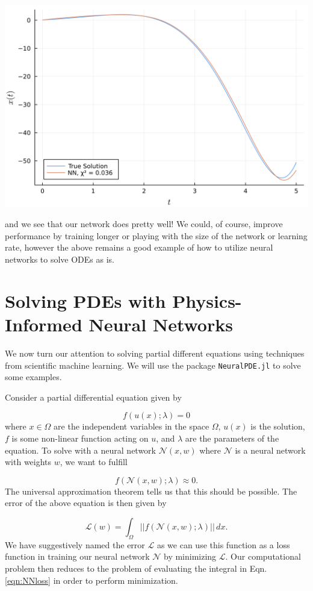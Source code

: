 \documentclass{CUP-JNL-DTM}%
\theoremstyle{definition}
\numberwithin{equation}{section}
\newcommand{\loss}{\mathcal{L}}
\newcommand{\net}{\mathcal{N}}
\begin{document}
\begin{center}
\includegraphics[width=0.45\linewidth]{figures/ODE_example.png}
\end{center}
and we see that our network does pretty well! We could, of course, improve performance by training longer or playing with the size of the network or learning rate, however the above remains a good example of how to utilize neural networks to solve ODEs as is. 


\section{Solving PDEs with Physics-Informed Neural Networks}

We now turn our attention to solving partial different equations using techniques from scientific machine learning. We will use the package \texttt{NeuralPDE.jl} \cite{zubovNeuralPDEAutomatingPhysicsInformed2021} to solve some examples. 

Consider a partial differential equation given by 

\begin{equation}
	f(u(x); \lambda) = 0
\end{equation}
where $x \in \Omega$ are the independent variables in the space $\Omega$, $u(x)$ is the solution, $f$ is some non-linear function acting on $u$, and $\lambda$ are the parameters of the equation. To solve with a neural network $\net(x, w)$ where $\net$ is a neural network with weights $w$, we want to fulfill 

\begin{equation}
	f(\net(x, w); \lambda) \approx 0.
	\label{eqn:NNapprox}
\end{equation}
The universal approximation theorem tells us that this should be possible. The error of the above equation is then given by 

\begin{equation}
	\loss(w) = \int_{\Omega} ||f(\net(x,w); \lambda)||\,dx. 
	\label{eqn:NNloss}
\end{equation}
We have suggestively named the error $\loss$ as we can use this function as a loss function in training our neural network $\net$ by minimizing $\loss$. Our computational problem then reduces to the problem of evaluating the integral in Eqn. \ref{eqn:NNloss} in order to perform minimization. 
\end{document}
